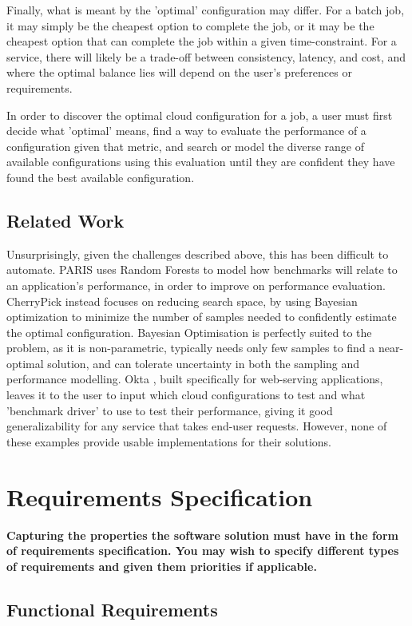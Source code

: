 \documentclass{article}
\begin{document}
Finally, what is meant by the 'optimal' configuration may differ. For a batch job, it may simply be the cheapest option to complete the job, or it may be the cheapest option that can complete the job within a given time-constraint. For a service, there will likely be a trade-off between consistency, latency, and cost, and where the optimal balance lies will depend on the user's preferences or requirements. 
\bigskip

In order to discover the optimal cloud configuration for a job, a user must first decide what 'optimal' means, find a way to evaluate the performance of a configuration given that metric, and search or model the diverse range of available configurations using this evaluation until they are confident they have found the best available configuration.

\subsection{Related Work}
Unsurprisingly, given the challenges described above, this has been difficult to automate. PARIS \cite{Yadwadkar2017} uses Random Forests to model how benchmarks will relate to an application's performance, in order to improve on performance evaluation. CherryPick \cite{Alipourfard2017} instead focuses on reducing search space, by using Bayesian optimization\cite{Shahriari2016} to minimize the number of samples needed to confidently estimate the optimal configuration. Bayesian Optimisation is perfectly suited to the problem, as it is non-parametric, typically needs only few samples to find a near-optimal solution, and can tolerate uncertainty in both the sampling and performance modelling\cite{Jones1998}. Okta \cite{Davatz2017}, built specifically for web-serving applications, leaves it to the user to input which cloud configurations to test and what 'benchmark driver' to use to test their performance, giving it good generalizability for any service that takes end-user requests. However, none of these examples provide usable implementations for their solutions.

\section{Requirements Specification}
\textbf{Capturing the properties the software solution must have
in the form of requirements specification. You may wish
to specify different types of requirements and given them
priorities if applicable.}
\subsection{Functional Requirements}
\end{document}
